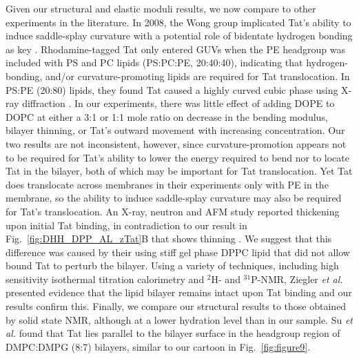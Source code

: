Given our structural and elastic moduli results, we now compare to other 
experiments in the literature. In 2008, the Wong group implicated Tat's 
ability to induce saddle-splay curvature
with a potential role of bidentate hydrogen bonding as key \cite{Mishra08}. 
Rhodamine-tagged Tat only entered GUVs when the PE headgroup was included with 
PS and PC lipids (PS:PC:PE, 20:40:40), indicating that hydrogen-bonding, and/or 
curvature-promoting lipids are required for Tat translocation. 
In PS:PE (20:80) lipids, they found Tat caused a highly curved cubic phase
using X-ray diffraction \cite{Mishra08}. In our experiments, there was little 
effect of adding DOPE to DOPC at either a 3:1 or 1:1 mole ratio on decrease in 
the bending modulus, bilayer thinning, or Tat's outward movement with increasing 
concentration. Our two results are not inconsistent, however, since 
curvature-promotion appears not to be required for Tat's ability to lower the 
energy required to bend nor to locate Tat in the bilayer, both of which may be 
important for Tat translocation. Yet Tat does translocate across
membranes in their experiments only with PE in the membrane, so the ability to 
induce saddle-splay curvature may also be required for Tat's translocation. 
An X-ray, neutron and AFM study reported thickening upon initial Tat binding, 
in contradiction to our result in Fig.~\ref{fig:DHH_DPP_AL_zTat}B that shows 
thinning \cite{Choi12}. 
We suggest that this difference was caused by their using stiff gel phase DPPC 
lipid that did not allow bound Tat to perturb the bilayer. 
Using a variety of techniques, including high sensitivity isothermal titration 
calorimetry and $^2$H- and $^{31}$P-NMR, Ziegler \textit{et al.} \cite{Ziegler03}
presented evidence that the lipid bilayer remains intact upon Tat binding
and our results confirm this. Finally, we compare our structural results to 
those obtained by solid state NMR, although at a lower hydration level than in 
our sample. Su \textit{et al.} \cite{Su10} found that Tat lies parallel to the 
bilayer surface in the headgroup region of DMPC:DMPG (8:7) bilayers,
similar to our cartoon in Fig.~\ref{fig:figure9}.

\newpage
